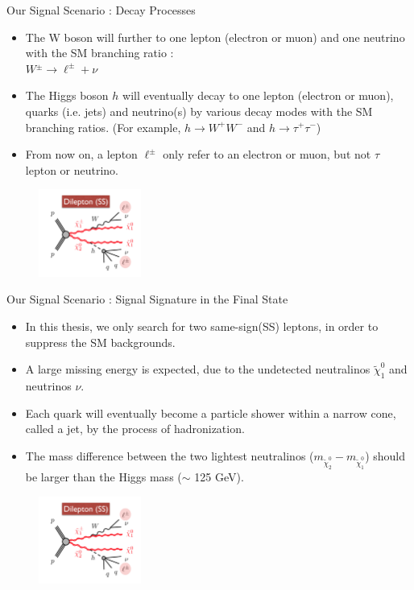 \documentclass[mathserif,serif]{beamer}
\begin{document}
\begin{frame}{Our Signal Scenario : Decay Processes}
\begin{itemize}
\item The W boson will further to one lepton (electron or muon) and one neutrino with the SM branching ratio : \\
$W{^\pm} \rightarrow \ell^{\pm} + \nu$
\item The Higgs boson $h$ will eventually decay to one lepton (electron or muon), quarks (i.e. jets) and neutrino(s) by various decay modes with the SM branching ratios. (For example, $h \rightarrow W^{+} W^{-} $ and $h \rightarrow \tau^{+} \tau^{-} $)
\item From now on, a lepton $\ell^{\pm}$ only refer to an electron or muon, but not $\tau$ lepton or neutrino.
\end{itemize}
\begin{figure}
\centering
\includegraphics[width=0.3\textwidth]{data/photo/theory/signal_feynman.png}
\end{figure}
\end{frame}

\begin{frame}{Our Signal Scenario : Signal Signature in the Final State}
\begin{itemize}
\item In this thesis, we only search for two same-sign(SS) leptons, in order to suppress the SM backgrounds.
\item A large missing energy is expected, due to the undetected neutralinos $\tilde{\chi}_1^0$ and neutrinos $\nu$.
\item Each quark will eventually become a particle shower within a narrow cone, called a jet, by the process of hadronization.
\item The mass difference between the two lightest neutralinos ($m_{\tilde{\chi}_2^0} - m_{\tilde{\chi}_1^0}$) should be larger than the Higgs mass ($\sim$ 125 GeV).
\end{itemize}
\begin{figure}
\centering
\includegraphics[width=0.3\textwidth]{data/photo/theory/signal_feynman.png}
\end{figure}
\end{frame}
\end{document}
